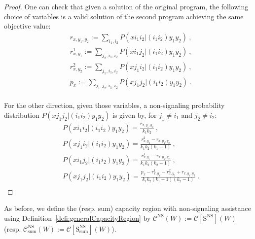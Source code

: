 \begin{proof}
  One can check that given a solution of the original program, the following choice of variables is a valid solution of the second program achieving the same objective value:
\begin{equation}
  \begin{aligned}
    &r_{x,y_1,y_2} := \sum_{i_1,i_2} P(xi_1i_2|(i_1i_2)y_1y_2)\ ,\\
    &r^1_{x,y_1} := \sum_{j_2,i_1,i_2} P(xi_1j_2|(i_1i_2)y_1y_2)\ ,\\
    &r^2_{x,y_2} := \sum_{j_1,i_1,i_2} P(xj_1i_2|(i_1i_2)y_1y_2)\ ,\\
    &p_x := \sum_{j_1,j_2,i_1,i_2} P(xj_1j_2|(i_1i_2)y_1y_2) \ .\\
  \end{aligned}
\end{equation}

For the other direction, given those variables, a non-signaling probability distribution $P(xj_1j_2|(i_1i_2)y_1y_2)$ is given by, for $j_1 \not= i_1$ and $j_2 \not= i_2$:
\begin{equation}
  \begin{aligned}
    &P(xi_1i_2|(i_1i_2)y_1y_2) = \frac{r_{x,y_1,y_2}}{k_1k_2}  \ ,\\
    &P(xj_1i_2|(i_1i_2)y_1y_2) = \frac{r^2_{x,y_2} - r_{x,y_1,y_2}}{k_1k_2(k_1-1)}  \ ,\\
    &P(xi_1j_2|(i_1i_2)y_1y_2) = \frac{r^1_{x,y_1} - r_{x,y_1,y_2}}{k_1k_2(k_2-1)} \ ,\\
    &P(xj_1j_2|(i_1i_2)y_1y_2) = \frac{p_{x} -  r^1_{x,y_1} - r^2_{x,y_2} + r_{x,y_1,y_2}}{k_1k_2(k_1-1)(k_2-1)} \ .\\
  \end{aligned}
\end{equation}
\end{proof}

As before, we define the (resp. sum) capacity region with non-signaling assistance using Definition~\ref{defi:generalCapacityRegion} by $\mathcal{C}^{\mathrm{NS}}(W) :=  \mathcal{C}[\mathrm{S}^{\mathrm{NS}}](W)$ (resp. $\mathcal{C}^{\mathrm{NS}}_{\text{sum}}(W) := \mathcal{C}[\mathrm{S}^{\mathrm{NS}}_{\text{sum}}](W)$).


